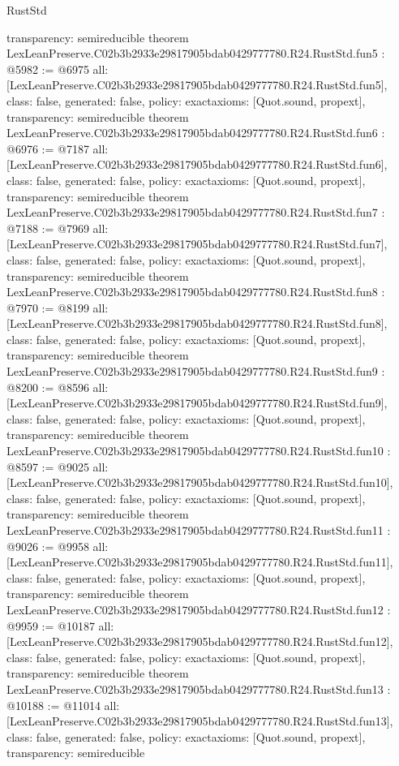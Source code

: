\begin{lexlean}{RustStd}
\begin{coremodule}
{  transparency: semireducible
}
theorem LexLeanPreserve.C02b3b2933e29817905bdab0429777780.R24.RustStd.fun5 : @5982 := @6975 {
  all: [LexLeanPreserve.C02b3b2933e29817905bdab0429777780.R24.RustStd.fun5],
  class: false,
  generated: false,
  policy: exact{axioms: [Quot.sound, propext]},
  transparency: semireducible
}
theorem LexLeanPreserve.C02b3b2933e29817905bdab0429777780.R24.RustStd.fun6 : @6976 := @7187 {
  all: [LexLeanPreserve.C02b3b2933e29817905bdab0429777780.R24.RustStd.fun6],
  class: false,
  generated: false,
  policy: exact{axioms: [Quot.sound, propext]},
  transparency: semireducible
}
theorem LexLeanPreserve.C02b3b2933e29817905bdab0429777780.R24.RustStd.fun7 : @7188 := @7969 {
  all: [LexLeanPreserve.C02b3b2933e29817905bdab0429777780.R24.RustStd.fun7],
  class: false,
  generated: false,
  policy: exact{axioms: [Quot.sound, propext]},
  transparency: semireducible
}
theorem LexLeanPreserve.C02b3b2933e29817905bdab0429777780.R24.RustStd.fun8 : @7970 := @8199 {
  all: [LexLeanPreserve.C02b3b2933e29817905bdab0429777780.R24.RustStd.fun8],
  class: false,
  generated: false,
  policy: exact{axioms: [Quot.sound, propext]},
  transparency: semireducible
}
theorem LexLeanPreserve.C02b3b2933e29817905bdab0429777780.R24.RustStd.fun9 : @8200 := @8596 {
  all: [LexLeanPreserve.C02b3b2933e29817905bdab0429777780.R24.RustStd.fun9],
  class: false,
  generated: false,
  policy: exact{axioms: [Quot.sound, propext]},
  transparency: semireducible
}
theorem LexLeanPreserve.C02b3b2933e29817905bdab0429777780.R24.RustStd.fun10 : @8597 := @9025 {
  all: [LexLeanPreserve.C02b3b2933e29817905bdab0429777780.R24.RustStd.fun10],
  class: false,
  generated: false,
  policy: exact{axioms: [Quot.sound, propext]},
  transparency: semireducible
}
theorem LexLeanPreserve.C02b3b2933e29817905bdab0429777780.R24.RustStd.fun11 : @9026 := @9958 {
  all: [LexLeanPreserve.C02b3b2933e29817905bdab0429777780.R24.RustStd.fun11],
  class: false,
  generated: false,
  policy: exact{axioms: [Quot.sound, propext]},
  transparency: semireducible
}
theorem LexLeanPreserve.C02b3b2933e29817905bdab0429777780.R24.RustStd.fun12 : @9959 := @10187 {
  all: [LexLeanPreserve.C02b3b2933e29817905bdab0429777780.R24.RustStd.fun12],
  class: false,
  generated: false,
  policy: exact{axioms: [Quot.sound, propext]},
  transparency: semireducible
}
theorem LexLeanPreserve.C02b3b2933e29817905bdab0429777780.R24.RustStd.fun13 : @10188 := @11014 {
  all: [LexLeanPreserve.C02b3b2933e29817905bdab0429777780.R24.RustStd.fun13],
  class: false,
  generated: false,
  policy: exact{axioms: [Quot.sound, propext]},
  transparency: semireducible
}
\end{coremodule}
\end{lexlean}
